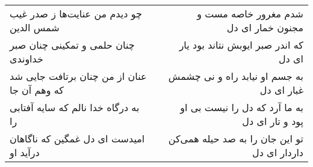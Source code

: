 \begin{center}
\begin{longtable}{l p{0.5cm} r}
\\
چو دیدم من عنایت‌ها ز صدر غیب شمس الدین
&&
شدم مغرور خاصه مست و مجنون خمار ای دل
\\
چنان حلمی و تمکینی چنان صبر خداوندی
&&
که اندر صبر ایوبش نتاند بود یار ای دل
\\
عنان از من چنان برتافت جایی شد که وهم آن جا
&&
به جسم او نیابد راه و نی چشمش غبار ای دل
\\
به درگاه خدا نالم که سایه آفتابی را
&&
به ما آرد که دل را نیست بی او پود و تار ای دل
\\
امیدست ای دل غمگین که ناگاهان درآید او
&&
تو این جان را به صد حیله همی‌کن داردار ای دل
\\
\end{longtable}
\end{center}
